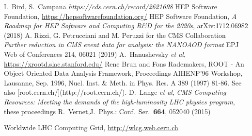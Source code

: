 \begin{thebibliography}{}
I.~Bird, S.~Campana \textit{https://cds.cern.ch/record/2621698}
HEP Software Foundation, \url{https://hepsoftwarefoundation.org/}
HEP Software Foundation, \textit{A Roadmap for HEP Software and Computing R\&D for the 2020s}, arXiv:1712.06982 (2018)
A. Rizzi, G. Petrucciani and M. Peruzzi for the CMS Collaboration \textit{Further reduction in CMS event data for analysis: the NANOAOD format} EPJ Web of Conferences 214, 06021 (2019)
A.~Hanushevsky {\em et al}, \url{https://xrootd.slac.stanford.edu/}
Rene Brun and Fons Rademakers, ROOT - An Object Oriented Data Analysis Framework,
Proceedings AIHENP'96 Workshop, Lausanne, Sep. 1996, Nucl. Inst. \& Meth. in Phys. Res. A 389 (1997) 81-86. See also [root.cern.ch/](http://root.cern.ch/).
D.~Lange {\em et al}, \textit{CMS Computing Resources: Meeting the demands of the high-luminosity LHC physics program}, these proceedings
R.~Vernet,J.\ Phys.: Conf.\ Ser.\ \textbf{664}, 052040 (2015)
\end{thebibliography}
Worldwide LHC Computing Grid, \url{http://wlcg.web.cern.ch}
